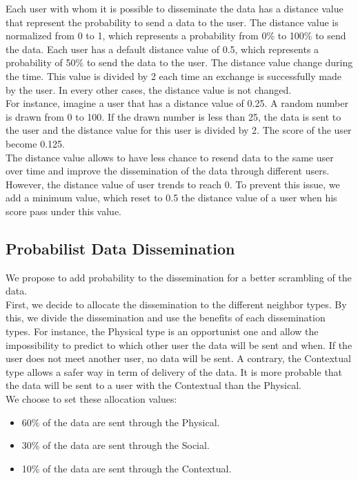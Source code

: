 Each user with whom it is possible to disseminate the data has a distance value that represent the probability to send a data to the user.
The distance value is normalized from 0 to 1, which represents a probability from 0\% to 100\% to send the data.
Each user has a default distance value of 0.5, which represents a probability of 50\% to send the data to the user.
The distance value change during the time.
This value is divided by 2 each time an exchange is successfully made by the user.
In every other cases, the distance value is not changed.
\\

For instance, imagine a user that has a distance value of 0.25. 
A random number is drawn from 0 to 100.
If the drawn number is less than 25, the data is sent to the user and the distance value for this user is divided by 2.
The score of the user become 0.125.
\\

The distance value allows to have less chance to resend data to the same user over time and improve the dissemination of the data through different users.
\\

However, the distance value of user trends to reach 0.
To prevent this issue, we add a minimum value, which reset to 0.5 the distance value of a user when his score pass under this value.

\subsection{Probabilist Data Dissemination}

We propose to add probability to the dissemination for a better scrambling of the data.
\\

First, we decide to allocate the dissemination to the different neighbor types.
By this, we divide the dissemination and use the benefits of each dissemination types.
For instance, the Physical type is an opportunist one and allow the impossibility to predict to which other user the data will be sent and when.
If the user does not meet another user, no data will be sent.
A contrary, the Contextual type allows a safer way in term of delivery of the data.
It is more probable that the data will be sent to a user with the Contextual than the Physical.
\\

We choose to set these allocation values:
\begin{itemize}
    \item 60\% of the data are sent through the Physical.
    \item 30\% of the data are sent through the Social.
    \item 10\% of the data are sent through the Contextual.
\end{itemize}

